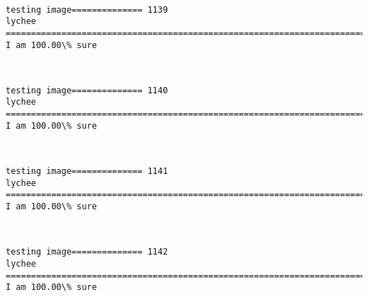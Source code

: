 \documentclass[11pt]{article}
\begin{document}
    \begin{center}
    \end{center}
    { \hspace*{\fill} \\}
    
    \begin{Verbatim}[commandchars=\\\{\}]
testing image============== 1139
lychee
============================================================================
I am 100.00\% sure

    \end{Verbatim}

    \begin{center}
    \end{center}
    { \hspace*{\fill} \\}
    
    \begin{Verbatim}[commandchars=\\\{\}]
testing image============== 1140
lychee
============================================================================
I am 100.00\% sure

    \end{Verbatim}

    \begin{center}
    \end{center}
    { \hspace*{\fill} \\}
    
    \begin{Verbatim}[commandchars=\\\{\}]
testing image============== 1141
lychee
============================================================================
I am 100.00\% sure

    \end{Verbatim}

    \begin{center}
    \end{center}
    { \hspace*{\fill} \\}
    
    \begin{Verbatim}[commandchars=\\\{\}]
testing image============== 1142
lychee
============================================================================
I am 100.00\% sure

    \end{Verbatim}
\end{document}
